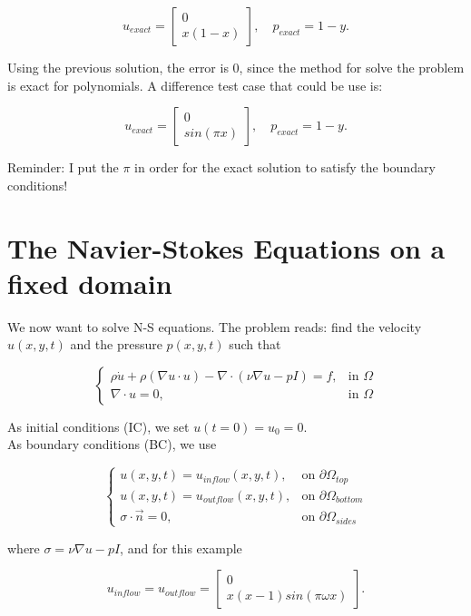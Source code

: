 \documentclass[11pt,a4paper,titlepage]{report}
\begin{document}
\[
u_{exact} = \left[ \begin{array}{c} 0 \\ x(1-x) \end{array} \right], \quad 
p_{exact} = 1-y.
\]

Using the previous solution, the error is 0, since the method for solve the problem is exact for polynomials.
A difference test case that could be use is:

\[
u_{exact} = \left[ \begin{array}{c} 0 \\ sin(\pi x) \end{array} \right], \quad 
p_{exact} = 1-y.
\]

Reminder: I put the $\pi$ in order for the exact solution to satisfy the boundary conditions!

\section{The Navier-Stokes Equations on a fixed domain}
We now want to solve N-S equations. The problem reads: find the velocity $u(x,y,t)$ and the pressure $p(x,y,t)$ such that

\[
\begin{cases}
\rho \dot{u} + \rho (\nabla u \cdot u) - \nabla \cdot (\nu \nabla u - pI) = f, & \mbox{in } \Omega \\
\nabla \cdot u = 0, & \mbox{in } \Omega
\end{cases}
\]

As initial conditions (IC), we set $u(t=0) = u_0 = 0$. \\
As boundary conditions (BC), we use

\[
\begin{cases}
u(x,y,t) = u_{inflow}(x,y,t) , & \mbox{on } \partial \Omega_{top} \\
u(x,y,t) = u_{outflow}(x,y,t) , & \mbox{on } \partial \Omega_{bottom} \\
\sigma \cdot \vec{n} = 0,  & \mbox{on } \partial \Omega_{sides}
\end{cases}
\]

where $\sigma = \nu \nabla u - pI$, and for this example

\begin{equation}
u_{inflow} = u_{outflow} =  \left[ \begin{array}{c} 0 \\ x(x-1)sin(\pi \omega x) \end{array} \right].
\end{equation}
\end{document}
